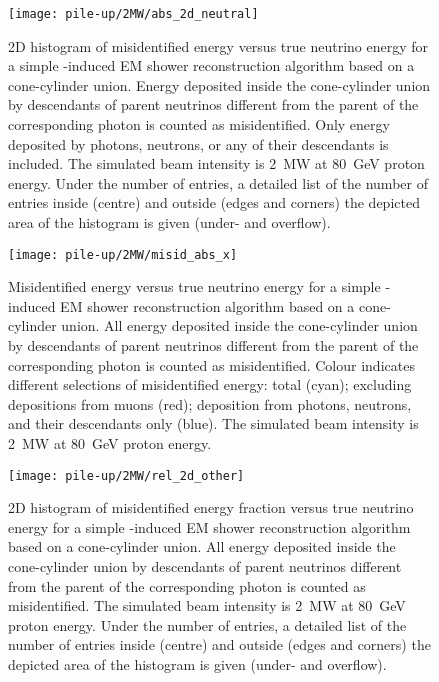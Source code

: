 \begin{figure}[htb]
	\centering
	\texttt{[image: pile-up/2MW/abs\_2d\_neutral]}
	\caption{2D histogram of misidentified energy versus true neutrino energy for a simple \Pgpz-induced EM shower reconstruction algorithm based on a cone-cylinder union.
		Energy deposited inside the cone-cylinder union by descendants of parent neutrinos different from the parent of the corresponding \Pgpz photon is counted as misidentified.
		Only energy deposited by photons, neutrons, or any of their descendants is included.
		The simulated beam intensity is \SI{2}{\mega\watt} at \SI{80}{\giga\electronvolt} proton energy.
		Under the number of entries, a detailed list of the number of entries inside (centre) and outside (edges and corners) the depicted area of the histogram is given (under- and overflow).}
\end{figure}

\begin{figure}[htb]
	\centering
	\texttt{[image: pile-up/2MW/misid\_abs\_x]}
	\caption{Misidentified energy versus true neutrino energy for a simple \Pgpz-induced EM shower reconstruction algorithm based on a cone-cylinder union.
		All energy deposited inside the cone-cylinder union by descendants of parent neutrinos different from the parent of the corresponding \Pgpz photon is counted as misidentified.
		Colour indicates different selections of misidentified energy: total (cyan); excluding depositions from muons (red); deposition from photons, neutrons, and their descendants only (blue).
		The simulated beam intensity is \SI{2}{\mega\watt} at \SI{80}{\giga\electronvolt} proton energy.}
\end{figure}

\begin{figure}[htb]
	\centering
	\texttt{[image: pile-up/2MW/rel\_2d\_other]}
	\caption{2D histogram of misidentified energy fraction versus true neutrino energy for a simple \Pgpz-induced EM shower reconstruction algorithm based on a cone-cylinder union.
		All energy deposited inside the cone-cylinder union by descendants of parent neutrinos different from the parent of the corresponding \Pgpz photon is counted as misidentified.
		The simulated beam intensity is \SI{2}{\mega\watt} at \SI{80}{\giga\electronvolt} proton energy.
		Under the number of entries, a detailed list of the number of entries inside (centre) and outside (edges and corners) the depicted area of the histogram is given (under- and overflow).}
\end{figure}

